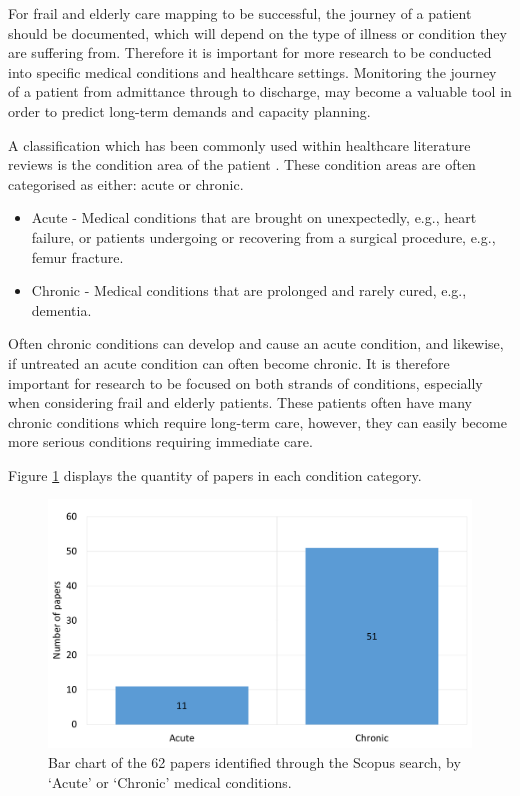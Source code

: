 \documentclass[../thesis.tex]{subfiles}
\begin{document}
For frail and elderly care mapping to be successful, the journey of a patient should be documented, which will depend on the type of illness or condition they are suffering from. Therefore it is important for more research to be conducted into specific medical conditions and healthcare settings. Monitoring the journey of a patient from admittance through to discharge, may become a valuable tool in order to predict long-term demands and capacity planning.

A classification which has been commonly used within healthcare literature reviews is the condition area of the patient \cite{Aspland,YZhang}. These condition areas are often categorised as either: acute or chronic.

\begin{itemize}
    \item Acute - Medical conditions that are brought on unexpectedly, e.g., heart failure, or patients undergoing or recovering from a surgical procedure, e.g., femur fracture.
    \item Chronic - Medical conditions that are prolonged and rarely cured, e.g., dementia.
\end{itemize}

Often chronic conditions can develop and cause an acute condition, and likewise, if untreated an acute condition can often become chronic. It is therefore important for research to be focused on both strands of conditions, especially when considering frail and elderly patients. These patients often have many chronic conditions which require long-term care, however, they can easily become more serious conditions requiring immediate care.

Figure \ref{fig:Condition} displays the quantity of papers in each condition category.

\begin{figure}[h!]
\centering
  \includegraphics[scale=0.3]{Chapter2/Figures/AcuteChronic.pdf} 
  \caption{Bar chart of the 62 papers identified through the Scopus search, by `Acute' or `Chronic' medical conditions.}
  \label{fig:Condition}
\end{figure} 
\end{document}
